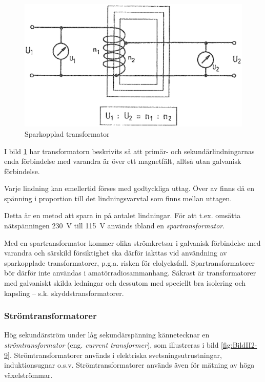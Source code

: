 \begin{figure}[h]
\begin{center}
\includegraphics[width=\textwidth]{images/cropped_pdfs/bild_2_2-08.pdf}
\caption{Sparkopplad transformator}
\label{fig:BildII2-8}
\end{center}
\end{figure}

I bild \ref{fig:BildII2-8} har transformatorn beskrivits så att primär- och
sekundärlindningarnas enda förbindelse med varandra är över ett magnetfält,
alltså utan galvanisk förbindelse.

Varje lindning kan emellertid förses med godtyckliga uttag. Över av finns då en
spänning i proportion till det lindningsvarvtal som finns mellan uttagen.

Detta är en metod att spara in på antalet lindningar. För att t.ex. omsätta
nätspänningen 230~V till 115~V används ibland en \emph{spartransformator}.

Med en spartransformator kommer olika strömkretsar i galvanisk förbindelse med
varandra och särskild försiktighet ska därför iakttas vid användning av
sparkopplade transformatorer, p.g.a. risken för elolycksfall.
Spartransformatorer bör därför inte användas i amatörradiosammanhang. Säkrast
är transformatorer med galvaniskt skilda ledningar och dessutom med speciellt
bra isolering och kapsling -- s.k. skyddstransformatorer.

\subsubsection{Strömtransformatorer}

Hög sekundärström under låg sekundärspänning kännetecknar en
\emph{strömtransformator} (eng. \emph{current transformer}),
som illustreras i bild \ref{fig:BildII2-9}.
Strömtransformatorer används i elektriska svetsningsutrustningar,
induktionsugnar o.s.v. Strömtransformatorer används även för mätning av höga
växelströmmar.

